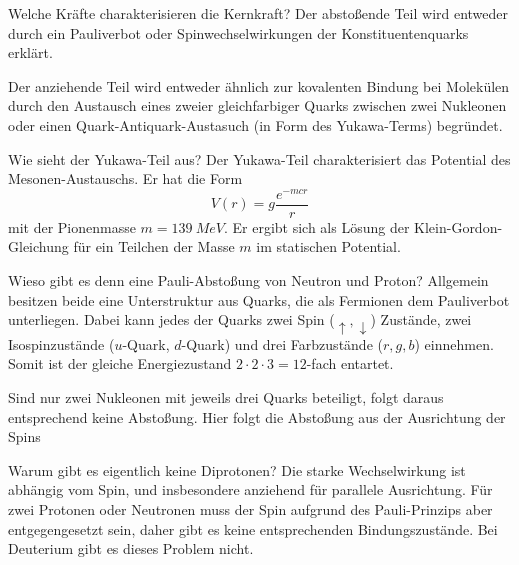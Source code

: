 \begin{fquestion}{Welche Kräfte charakterisieren die Kernkraft?}
    Der abstoßende Teil wird entweder durch ein Pauliverbot oder Spinwechselwirkungen der Konstituentenquarks erklärt.
    
    Der anziehende Teil wird entweder ähnlich zur kovalenten Bindung bei Molekülen durch den Austausch eines zweier gleichfarbiger Quarks zwischen zwei Nukleonen oder einen Quark-Antiquark-Austasuch (in Form des Yukawa-Terms) begründet.
\end{fquestion}

\begin{fquestion}{Wie sieht der Yukawa-Teil aus?}
    Der Yukawa-Teil charakterisiert das Potential des Mesonen-Austauschs.
    Er hat die Form
    \[V(r) = g \frac{e^{-mcr}}{r}\]
    mit der Pionenmasse $m = \SI{139}{MeV}$.
    Er ergibt sich als Lösung der Klein-Gordon-Gleichung für ein Teilchen der Masse $m$ im statischen Potential.
\end{fquestion}

\begin{fquestion}{Wieso gibt es denn eine Pauli-Abstoßung von Neutron und Proton?}
    Allgemein besitzen beide eine Unterstruktur aus Quarks, die als Fermionen dem Pauliverbot unterliegen. 
    Dabei kann jedes der Quarks zwei Spin ($\uparrow, \downarrow$) Zustände, zwei Isospinzustände ($u$-Quark, $d$-Quark) und drei Farbzustände ($r, g, b$) einnehmen.
    Somit ist der gleiche Energiezustand $2 \cdot 2 \cdot 3 = 12$-fach entartet. 
    
    Sind nur zwei Nukleonen mit jeweils drei Quarks beteiligt, folgt daraus entsprechend keine Abstoßung.
    Hier folgt die Abstoßung aus der Ausrichtung der Spins
\end{fquestion}

\begin{fquestion}{Warum gibt es eigentlich keine Diprotonen?}
    Die starke Wechselwirkung ist abhängig vom Spin, und insbesondere anziehend für parallele Ausrichtung.
    Für zwei Protonen oder Neutronen muss der Spin aufgrund des Pauli-Prinzips aber entgegengesetzt sein, daher gibt es keine entsprechenden Bindungszustände.
    Bei Deuterium gibt es dieses Problem nicht.
\end{fquestion}


